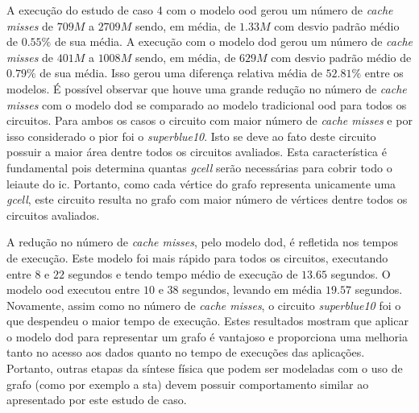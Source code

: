 

A execução do estudo de caso 4 com o modelo \ac{ood} gerou um número de  \textit{cache misses} de $709M$ a $2709M$ sendo, em média, de $1.33M$ com desvio padrão médio de $0.55\%$ de sua média. 
A execução com o modelo \ac{dod} gerou um número de  \textit{cache misses} de $401M$ a $1008M$ sendo, em média, de $629M$ com desvio padrão médio de $0.79\%$ de sua média.
Isso gerou uma diferença relativa média de $52.81\%$ entre os modelos.
É possível observar que houve uma grande redução no número de  \textit{cache misses} com o modelo \ac{dod} se comparado ao modelo tradicional \ac{ood} para todos os circuitos.
Para ambos os casos o circuito com maior número de  \textit{cache misses} e por isso considerado o pior foi o \textit{superblue10}.
Isto se deve ao fato deste circuito possuir a maior área dentre todos os circuitos avaliados.
Esta característica é fundamental pois determina quantas \textit{gcell} serão necessárias para cobrir todo o leiaute do \ac{ic}.
Portanto, como cada vértice do grafo representa unicamente uma \textit{gcell}, este circuito resulta no grafo com maior número de vértices dentre todos os circuitos avaliados.

A redução no número de  \textit{cache misses}, pelo modelo \ac{dod}, é refletida nos tempos de execução.
Este modelo foi mais rápido para todos os circuitos, executando entre $8$ e $22$ segundos e tendo tempo médio de execução de $13.65$ segundos.
O modelo \ac{ood} executou entre $10$ e $38$ segundos, levando em média $19.57$ segundos.
Novamente, assim como no número de  \textit{cache misses}, o circuito \textit{superblue10} foi o que despendeu o maior tempo de execução.
Estes resultados mostram que aplicar o modelo \ac{dod} para representar um grafo é vantajoso e proporciona uma melhoria tanto no acesso aos dados quanto no tempo de execuções das aplicações.
Portanto, outras etapas da síntese física que podem ser modeladas com o uso de grafo (como por exemplo a \ac{sta}) devem possuir comportamento similar ao apresentado por este estudo de caso.


